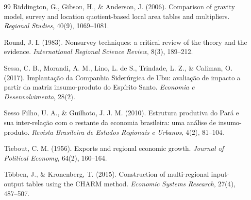 \documentclass[11pt,a4paper]{article}
\begin{document}
\begin{thebibliography}{99}
Riddington, G., Gibson, H., \& Anderson, J. (2006). Comparison of gravity model,
survey and location quotient-based local area tables and multipliers.
\textit{Regional Studies}, 40(9), 1069--1081.

Round, J. I. (1983). Nonsurvey techniques: a critical review of the theory and the
evidence. \textit{International Regional Science Review}, 8(3), 189--212.

Sessa, C. B., Morandi, A. M., Lino, L. de S., Trindade, L. Z., \& Caliman, O. (2017).
Implantação da Companhia Siderúrgica de Ubu: avaliação de impacto a partir da matriz
insumo-produto do Espírito Santo. \textit{Economia e Desenvolvimento}, 28(2).

Sesso Filho, U. A., \& Guilhoto, J. J. M. (2010). Estrutura produtiva do Pará e sua
inter-relação com o restante da economia brasileira: uma análise de insumo-produto.
\textit{Revista Brasileira de Estudos Regionais e Urbanos}, 4(2), 81--104.

Tiebout, C. M. (1956). Exports and regional economic growth. \textit{Journal of Political
Economy}, 64(2), 160--164.

Többen, J., \& Kronenberg, T. (2015). Construction of multi-regional input-output
tables using the CHARM method. \textit{Economic Systems Research}, 27(4), 487--507.

\end{thebibliography}
\end{document}
